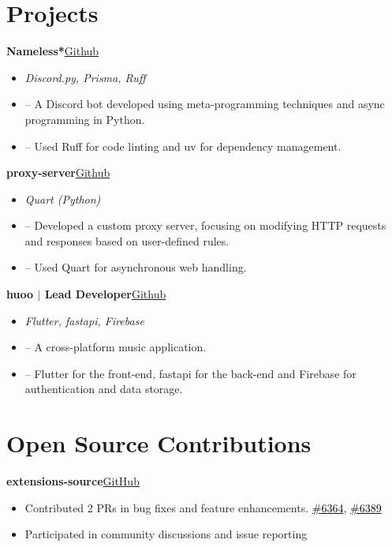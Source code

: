 \documentclass[a4paper,12pt]{article}
\newenvironment{itemList}[3][]
    {
    \noindent\hspace{1em}\textbf{#2}\hfill#3\\[3.75pt]
    \begin{minipage}[t]{\linewidth}
    \begin{itemize}[nosep,after=\strut, leftmargin=2em, itemsep=3pt, label={}, #1]
    }
    {
    \end{itemize}
    \end{minipage}
    }
\newcommand{\listSubHeading}[1]{
    \item[] \noindent\hspace{-1em}\textit{#1}
    }
\begin{document}
\section{Projects}
\begin{itemList}{Nameless*}{\href{https://github.com/team-nameless/nameless-discord-bot/}{Github}}
    \listSubHeading{Discord.py, Prisma, Ruff}
    \item -- A Discord bot developed using meta-programming techniques and async programming in Python.
    \item -- Used Ruff for code linting and uv for dependency management.
\end{itemList}

\begin{itemList}{proxy-server}{\href{https://github.com/foxeiz/proxy-server/}{Github}}
    \listSubHeading{Quart (Python)}
    \item -- Developed a custom proxy server, focusing on modifying HTTP requests and responses based on user-defined rules.
    \item -- Used Quart for asynchronous web handling.
\end{itemList}

\begin{itemList}{huoo $|$ Lead Developer}{\href{https://github.com/foxeiz/huoo/}{Github}}
    \listSubHeading{Flutter, fastapi, Firebase}
    \item -- A cross-platform music application.
    \item -- Flutter for the front-end, fastapi for the back-end and Firebase for authentication and data storage.
\end{itemList}

\newpage

\section{Open Source Contributions}
\begin{itemList}{extensions-source}{\href{https://github.com/keiyoushi/extensions-source}{GitHub}}
    \item Contributed 2 PRs in bug fixes and feature enhancements. \hfill {\href{https://github.com/keiyoushi/extensions-source/pull/6364}{\footnotesize\textcolor{black}{\#6364}}}, {\href{https://github.com/keiyoushi/extensions-source/pull/6389}{\footnotesize\textcolor{black}{\#6389}}}
    \item Participated in community discussions and issue reporting
\end{itemList}
\end{document}
